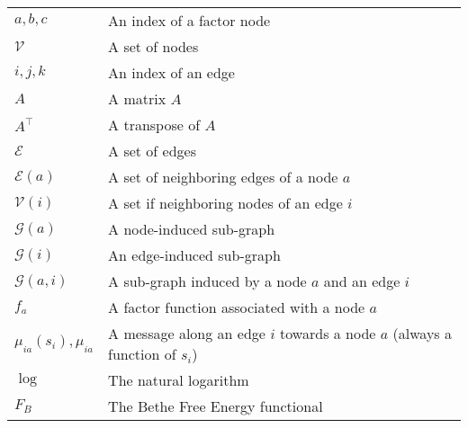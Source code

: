 \begin{table}[H]
\begin{tabularx}{\textwidth}{l X}
    $a, b, c$                  & An index of a factor node                                                                             \\
    $\mathcal{V}$              & A set of nodes                                                                                        \\
    $i, j, k$                  & An index of an edge                                                                                   \\
    $A$                        & A matrix $A$                                                                                          \\
    $A^\intercal$              & A transpose of $A$                                                                                    \\
    $\mathcal{E}$              & A set of edges                                                                                        \\
    $\mathcal{E}(a)$           & A set of neighboring edges of a node $a$                                                              \\
    $\mathcal{V}(i)$           & A set if neighboring nodes of an edge $i$                                                             \\
    $\mathcal{G}(a)$           & A node-induced sub-graph                                                                              \\
    $\mathcal{G}(i)$           & An edge-induced sub-graph                                                                             \\
    $\mathcal{G}(a, i)$        & A sub-graph induced by a node $a$ and an edge $i$                                                     \\
    $f_a$                      & A factor function associated with a node $a$                                                          \\
    $\mu_{ia}(s_i), \mu_{ia}$  & A message along an edge $i$ towards a node $a$ (always a function of $s_i$)                           \\
    $\log{}$                   & The natural logarithm                                                                                 \\
    $F_B$                      & The Bethe Free Energy functional                                                                      \\
  \end{tabularx}
  \label{tab:notation_math}
\end{table}

